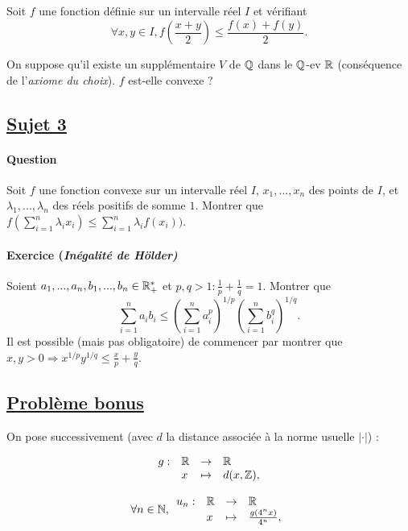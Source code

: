 \documentclass[12pt,a4paper]{report}
\begin{document}
Soit $f$ une fonction définie sur un intervalle réel $I$ et vérifiant 
$$\forall x,y\in I, f\left(\frac{x+y}{2}\right)\leq\frac{f(x)+f(y)}{2}.$$

On suppose qu'il existe un supplémentaire $V$ de $\mathbb{Q}$ dans le $\mathbb{Q}$-ev $\mathbb{R}$ (conséquence de l'\emph{axiome du choix}). $f$ est-elle convexe ?

\subsection*{\underline{Sujet 3}}

\paragraph*{Question} %

Soit $f$ une fonction convexe sur un intervalle réel $I$, $x_1, ..., x_n$ des points de $I$, et $\lambda_1,...,\lambda_n$ des réels positifs de somme $1$. Montrer que $f(\sum\limits_{i=1}^n\lambda_ix_i)\leq\sum\limits_{i=1}^n\lambda_if(x_i))$.

\paragraph*{Exercice (\emph{Inégalité de Hölder)}} %

Soient $a_1, ..., a_n, b_1, ..., b_n \in \mathbb{R}_+^*$ et $p,q>1:\frac{1}{p}+\frac{1}{q}=1$. Montrer que 
$$\sum\limits_{i=1}^na_ib_i\leq\left(\sum\limits_{i=1}^na_i^p\right)^{1/p}\left(\sum\limits_{i=1}^nb_i^q\right)^{1/q}.$$
Il est possible (mais pas obligatoire) de commencer par montrer que $x,y>0\Rightarrow x^{1/p}y^{1/q}\leq\frac{x}{p}+\frac{y}{q}$.

\subsection*{\underline{Problème bonus}} %

On pose successivement (avec $d$ la distance associée à la norme usuelle $|\cdot |$) :

$$\begin{array}{llll}
g : & \mathbb{R} & \rightarrow & \mathbb{R}\\
& x & \mapsto & d(x,\mathbb{Z}),
\end{array}$$

$$\forall n \in \mathbb{N}, \begin{array}{llll}
u_n : & \mathbb{R} & \rightarrow & \mathbb{R}\\
& x & \mapsto & \frac{g(4^nx)}{4^n},
\end{array}$$
\end{document}
